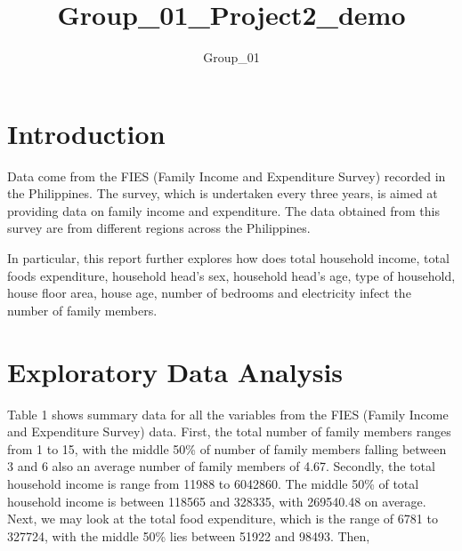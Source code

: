 \documentclass[
]{article}
\title{Group\_01\_Project2\_demo}
\author{Group\_01}
\date{}
\begin{document}
\maketitle

\hypertarget{sec:Intro}{%
\section{Introduction}\label{sec:Intro}}

Data come from the FIES (Family Income and Expenditure Survey) recorded
in the Philippines. The survey, which is undertaken every three years,
is aimed at providing data on family income and expenditure. The data
obtained from this survey are from different regions across the
Philippines.

In particular, this report further explores how does total household
income, total foods expenditure, household head's sex, household head's
age, type of household, house floor area, house age, number of bedrooms
and electricity infect the number of family members.

\hypertarget{sec:EDA}{%
\section{Exploratory Data Analysis}\label{sec:EDA}}

Table 1 shows summary data for all the variables from the FIES (Family
Income and Expenditure Survey) data. First, the total number of family
members ranges from 1 to 15, with the middle 50\% of number of family
members falling between 3 and 6 also an average number of family members
of 4.67. Secondly, the total household income is range from 11988 to
6042860. The middle 50\% of total household income is between 118565 and
328335, with 269540.48 on average. Next, we may look at the total food
expenditure, which is the range of 6781 to 327724, with the middle 50\%
lies between 51922 and 98493. Then,
\end{document}
